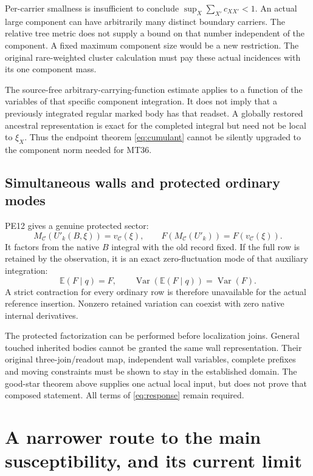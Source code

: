 \documentclass[11pt,letterpaper]{article}
\theoremstyle{remark}\newtheorem{remark}[theorem]{Remark}
\newcommand{\E}{\mathbb E}
\newcommand{\Var}{\operatorname{Var}}\newcommand{\Cov}{\operatorname{Cov}}
\begin{document}
Per-carrier smallness is insufficient to conclude
\(\sup_X\sum_{X'}c_{XX'}<1\).
An actual large component can have arbitrarily many distinct boundary carriers. The relative tree metric does not supply a bound on that number independent of the component. A fixed maximum component size would be a new restriction. The original rare-weighted cluster calculation must pay these actual incidences with its one component mass.

The source-free arbitrary-carrying-function estimate applies to a function of the variables of that specific component integration. It does not imply that a previously integrated regular marked body has that readset. A globally restored ancestral representation is exact for the completed integral but need not be local to \(\xi_X\). Thus the endpoint theorem \eqref{eq:cumulant} cannot be silently upgraded to the component norm needed for MT36.

\subsection{Simultaneous walls and protected ordinary modes}

PE12 gives a genuine protected sector:
\[
 M_{\mathcal C}(U'_k(B,\xi))=v_{\mathcal C}(\xi),\qquad
 F(M_{\mathcal C}(U'_k))=F(v_{\mathcal C}(\xi)).
\]
It factors from the native \(B\) integral with the old record fixed. If the full row is retained by the observation, it is an exact zero-fluctuation mode of that auxiliary integration:
\[
 \E(F\mid q)=F,\qquad \Var(\E(F\mid q))=\Var(F).
\]
A strict contraction for every ordinary row is therefore unavailable for the actual reference insertion. Nonzero retained variation can coexist with zero native internal derivatives.

The protected factorization can be performed before localization joins. General touched inherited bodies cannot be granted the same wall representation. Their original three-join/readout map, independent wall variables, complete prefixes and moving constraints must be shown to stay in the established domain. The good-star theorem above supplies one actual local input, but does not prove that composed statement. All terms of \eqref{eq:response} remain required.

\section{A narrower route to the main susceptibility, and its current limit}
\end{document}
